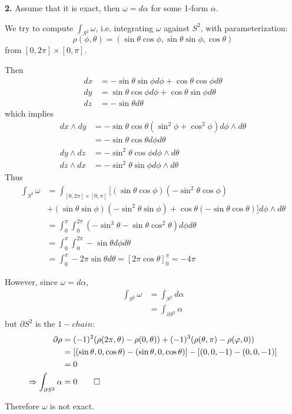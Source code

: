 \documentclass[a4paper, 12pt]{article}
\begin{document}
\begin{solution}
    \textbf{2.} Assume that it is exact, then $\omega = d\alpha$ for some 1-form $\alpha$.

    We try to compute $\int_{S^2} \omega$, i.e. integrating $\omega$ against $S^2$, with parameterization: \[
    \rho(\phi, \theta) = (\sin \theta \cos \phi, \sin \theta \sin \phi, \cos \theta)
    \]
    from $[0, 2\pi] \times [0, \pi]$.

    Then 
    \begin{align*}
    dx &= -\sin \theta \sin \phi d \phi + \cos \theta \cos \phi d \theta \\
    dy &= \sin \theta \cos \phi d\phi + \cos \theta \sin \phi d \theta \\
    dz &= - \sin \theta d \theta
    \end{align*}
    which implies \begin{align*}
    dx \wedge dy &= -\sin \theta \cos \theta (\sin^2 \phi + \cos^2 \phi) d \phi \wedge d \theta \\
    &= -\sin \theta \cos \theta d \phi d \theta \\
    dy \wedge dz &= - \sin^2 \theta \cos \phi d \phi \wedge d \theta\\
    dz \wedge dx &= -\sin^2 \theta \sin \phi d\phi \wedge d \theta
    \end{align*}
    Thus \begin{align*}
    \int_{S^2} \omega &= \int_{[0, 2\pi] \times [0, \pi]} [(\sin \theta \cos \phi)(-\sin^2\theta \cos \phi) \\
    &+ (\sin \theta \sin \phi) (-\sin^2 \theta \sin \phi) + \cos \theta (-\sin \theta \cos \theta)] d\phi \wedge d \theta  \\
    &= \int_{0}^{\pi} \int_{0}^{2\pi} (-\sin^3 \theta - \sin \theta \cos^2 \theta) d \phi d \theta \\
    &= \int_{0}^{\pi} \int_{0}^{2\pi} -\sin \theta d \phi d \theta \\
    &= \int_{0}^{\pi} -2\pi \sin \theta d \theta = [2\pi \cos \theta]_{0}^{\pi} = -4 \pi
    \end{align*}

    However, since $\omega = d \alpha$, 
    \begin{align*}
    \int_{S^2} \omega &= \int_{S^2} {d \alpha} \\
    &= \int_{\partial S^2} \alpha
    \end{align*}
    but $\partial S^2$ is the $1-chain$: \begin{align*}
        \partial \rho &= (-1)^{2} (\rho(2\pi , \theta) - \rho(0, \theta)) + (-1)^{3} (\rho(\theta, \pi) - \rho(\phi, 0)) \\
        &= [(\sin \theta, 0, \cos \theta) - (\sin \theta, 0, \cos \theta)] - [(0, 0, -1) -(0, 0, -1)] \\
        &= 0 \\
        \implies \int_{\partial S^2} \alpha &= 0 \qed
    \end{align*}

    Therefore $\omega$ is not exact. 
\end{solution}
\end{document}
